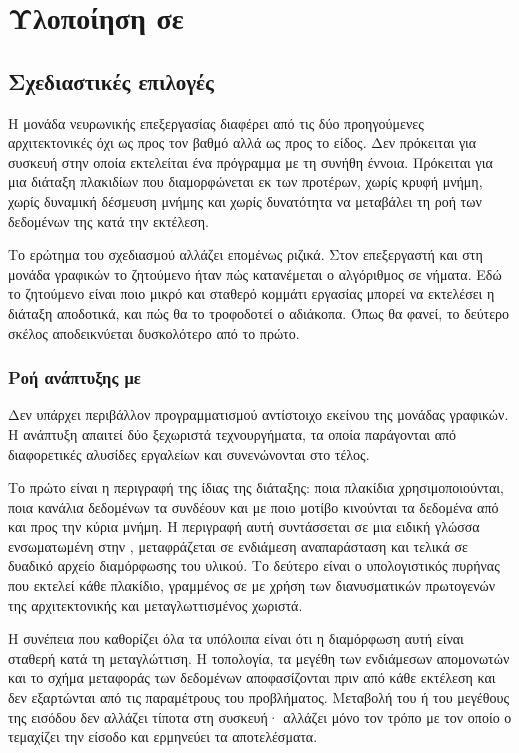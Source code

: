 \chapter{Υλοποίηση σε }
\label{ch:npu}

\section{Σχεδιαστικές επιλογές}
\label{sec:npu-design}

Η μονάδα νευρωνικής επεξεργασίας διαφέρει από τις δύο προηγούμενες αρχιτεκτονικές
όχι ως προς τον βαθμό αλλά ως προς το είδος. Δεν πρόκειται για συσκευή στην
οποία εκτελείται ένα πρόγραμμα με τη συνήθη έννοια. Πρόκειται για μια διάταξη
πλακιδίων που διαμορφώνεται εκ των προτέρων, χωρίς κρυφή μνήμη, χωρίς δυναμική
δέσμευση μνήμης και χωρίς δυνατότητα να μεταβάλει τη ροή των δεδομένων της κατά
την εκτέλεση.

Το ερώτημα του σχεδιασμού αλλάζει επομένως ριζικά. Στον επεξεργαστή και στη
μονάδα γραφικών το ζητούμενο ήταν πώς κατανέμεται ο αλγόριθμος σε νήματα. Εδώ
το ζητούμενο είναι ποιο μικρό και σταθερό κομμάτι εργασίας μπορεί να εκτελέσει
η διάταξη αποδοτικά, και πώς θα το τροφοδοτεί ο  αδιάκοπα. Όπως θα
φανεί, το δεύτερο σκέλος αποδεικνύεται δυσκολότερο από το πρώτο.

\subsection{Ροή ανάπτυξης με }
\label{sec:npu-toolchain}

Δεν υπάρχει περιβάλλον προγραμματισμού αντίστοιχο εκείνου της μονάδας γραφικών.
Η ανάπτυξη απαιτεί δύο ξεχωριστά τεχνουργήματα, τα οποία παράγονται από
διαφορετικές αλυσίδες εργαλείων και συνενώνονται στο τέλος.

Το πρώτο είναι η περιγραφή της ίδιας της διάταξης: ποια πλακίδια
χρησιμοποιούνται, ποια κανάλια δεδομένων τα συνδέουν και με ποιο μοτίβο
κινούνται τα δεδομένα από και προς την κύρια μνήμη. Η περιγραφή αυτή συντάσσεται
σε μια ειδική γλώσσα ενσωματωμένη στην , μεταφράζεται σε ενδιάμεση
αναπαράσταση και τελικά σε δυαδικό αρχείο διαμόρφωσης του υλικού. Το δεύτερο
είναι ο υπολογιστικός πυρήνας που εκτελεί κάθε πλακίδιο, γραμμένος σε 
με χρήση των διανυσματικών πρωτογενών της αρχιτεκτονικής και μεταγλωττισμένος
χωριστά.

Η συνέπεια που καθορίζει όλα τα υπόλοιπα είναι ότι η διαμόρφωση αυτή είναι
σταθερή κατά τη μεταγλώττιση. Η τοπολογία, τα μεγέθη των ενδιάμεσων
απομονωτών και το σχήμα μεταφοράς των δεδομένων αποφασίζονται πριν από κάθε
εκτέλεση και δεν εξαρτώνται από τις παραμέτρους του προβλήματος. Μεταβολή του
 ή του μεγέθους της εισόδου δεν αλλάζει τίποτα στη συσκευή· αλλάζει μόνο
τον τρόπο με τον οποίο ο  τεμαχίζει την είσοδο και ερμηνεύει τα
αποτελέσματα.

